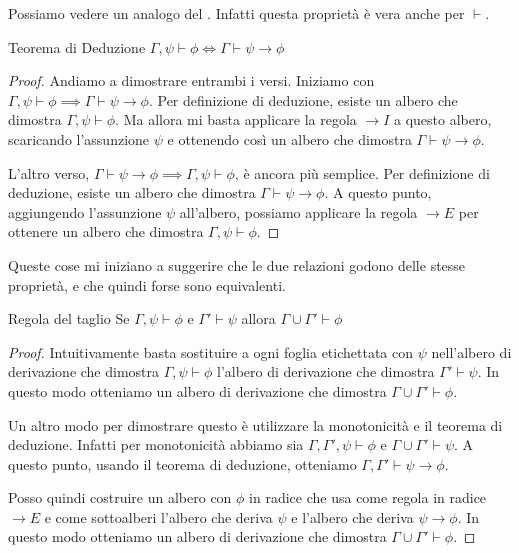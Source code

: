 Possiamo vedere un analogo del . Infatti questa proprietà è vera anche per \(\vdash\).

\begin{theorem}{Teorema di Deduzione}
  \(\Gamma, \psi \vdash \phi \iff \Gamma \vdash \psi \to \phi\)
\end{theorem}

\begin{proof}
  Andiamo a dimostrare entrambi i versi. Iniziamo con \(\Gamma, \psi \vdash \phi \implies \Gamma \vdash \psi \to \phi\). Per definizione di deduzione, esiste un albero che dimostra \(\Gamma, \psi \vdash \phi\). Ma allora mi basta applicare la regola \(\to I\) a questo albero, scaricando l'assunzione \(\psi\) e ottenendo così un albero che dimostra \(\Gamma \vdash \psi \to \phi\).

  L'altro verso, \(\Gamma \vdash \psi \to \phi \implies \Gamma, \psi \vdash \phi\), è ancora più semplice. Per definizione di deduzione, esiste un albero che dimostra \(\Gamma \vdash \psi \to \phi\). A questo punto, aggiungendo l'assunzione \(\psi\) all'albero, possiamo applicare la regola \(\to E\) per ottenere un albero che dimostra \(\Gamma, \psi \vdash \phi\).
\end{proof}

Queste cose mi iniziano a suggerire che le due relazioni godono delle stesse proprietà, e che quindi forse sono equivalenti.

\begin{theorem}{Regola del taglio}
  Se \(\Gamma, \psi \vdash \phi\) e \(\Gamma' \vdash \psi\) allora \(\Gamma \cup \Gamma' \vdash \phi\)
\end{theorem}

\begin{proof}
  Intuitivamente basta sostituire a ogni foglia etichettata con \(\psi\) nell'albero di derivazione che dimostra \(\Gamma, \psi \vdash \phi\) l'albero di derivazione che dimostra \(\Gamma' \vdash \psi\). In questo modo otteniamo un albero di derivazione che dimostra \(\Gamma \cup \Gamma' \vdash \phi\).

  Un altro modo per dimostrare questo è utilizzare la monotonicità e il teorema di deduzione.
  Infatti per monotonicità abbiamo sia \(\Gamma, \Gamma', \psi \vdash \phi\) e \(\Gamma \cup \Gamma'\vdash \psi\).
  A questo punto, usando il teorema di deduzione, otteniamo \(\Gamma, \Gamma' \vdash \psi \to \phi\). 

  Posso quindi costruire un albero con \(\phi\) in radice che usa come regola in radice \(\to E\) e come sottoalberi l'albero che deriva \(\psi\) e l'albero che deriva \(\psi \to \phi\). In questo modo otteniamo un albero di derivazione che dimostra \(\Gamma \cup \Gamma' \vdash \phi\).
\end{proof}

